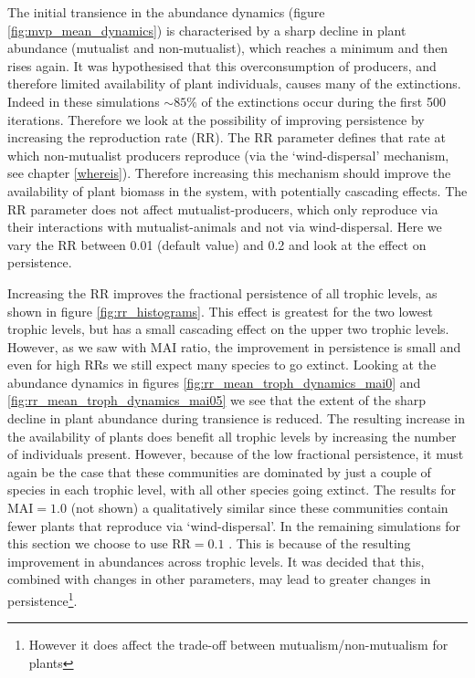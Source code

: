 The initial transience in the abundance dynamics (figure \ref{fig:mvp_mean_dynamics}) is characterised by a sharp decline in plant abundance (mutualist and non-mutualist), which reaches a minimum and then rises again. It was hypothesised that this overconsumption of producers, and therefore limited availability of plant individuals, causes many of the extinctions. Indeed in these simulations $\sim 85\%$ of the extinctions occur during the first 500 iterations. Therefore we look at the possibility of improving persistence by increasing the reproduction rate (RR). The RR parameter defines that rate at which non-mutualist producers reproduce (via the `wind-dispersal' mechanism, see chapter \ref{whereis}). Therefore increasing this mechanism should improve the availability of plant biomass in the system, with potentially cascading effects. The RR parameter does not affect mutualist-producers, which only reproduce via their interactions with mutualist-animals and not via wind-dispersal. Here we vary the RR between 0.01 (default value) and 0.2 and look at the effect on persistence.

Increasing the RR improves the fractional persistence of all trophic levels, as shown in figure \ref{fig:rr_histograms}. This effect is greatest for the two lowest trophic levels, but has a small cascading effect on the upper two trophic levels. However, as we saw with MAI ratio, the improvement in persistence is small and even for high RRs we still expect many species to go extinct. Looking at the abundance dynamics in figures \ref{fig:rr_mean_troph_dynamics_mai0} and \ref{fig:rr_mean_troph_dynamics_mai05} we see that the extent of the sharp decline in plant abundance during transience is reduced. The resulting increase in the availability of plants does benefit all trophic levels by increasing the number of individuals present. However, because of the low fractional persistence, it must again be the case that these communities are dominated by just a couple of species in each trophic level, with all other species going extinct. The results for MAI$=1.0$ (not shown) a qualitatively similar since these communities contain fewer plants that reproduce via `wind-dispersal'. In the remaining simulations for this section we choose to use RR$=0.1$ . This is because of the resulting improvement in abundances across trophic levels. It was decided that this, combined with changes in other parameters, may lead to greater changes in persistence\footnote{However it does affect the trade-off between mutualism/non-mutualism for plants}.


